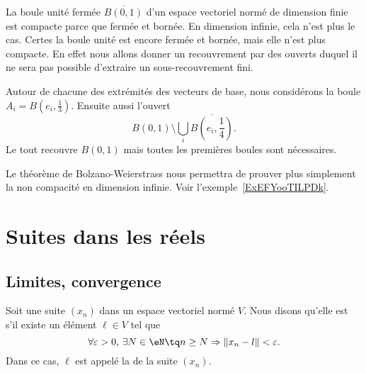 \begin{example}
    La boule unité fermée \( \overline{ B(0,1) }\) d'un espace vectoriel normé de dimension finie est compacte parce que fermée et bornée. En dimension infinie, cela n'est plus le cas. Certes la boule unité est encore fermée et bornée, mais elle n'est plus compacte. En effet nous allons donner un recouvrement par des ouverts duquel il ne sera pas possible d'extraire un sous-recouvrement fini.

    Autour de chacune des extrémités des vecteurs de base, nous considérons la boule \( A_i=B(e_i,\frac{1}{ 3 })\). Ensuite aussi l'ouvert
    \begin{equation}
        B(0,1)\setminus\bigcup_i\overline{ B(e_i,\frac{1}{ 4 })}.
    \end{equation}
    Le tout recouvre \( B(0,1)\) mais toutes les premières boules sont nécessaires.
\end{example}

Le théorème de Bolzano-Weierstrass nous permettra de prouver plus simplement la non compacité en dimension infinie. Voir l'exemple~\ref{ExEFYooTILPDk}.

\section{Suites dans les réels}
\label{SECooLLUGooOwZRyI}

\subsection{Limites, convergence}

\begin{definition}		\label{DefCvSuiteEGVN}
	Soit une suite $(x_n)$ dans un espace vectoriel normé $V$. Nous disons qu'elle est
     s'il existe un élément $\ell\in V$ tel que
	\begin{equation}
		\forall \varepsilon>0,\,\exists N\in\eN\tq n\geq N\Rightarrow \| x_n-l \|<\varepsilon.
	\end{equation}
	Dans ce cas, $\ell$ est appelé la  de la suite $(x_n)$.
\end{definition}

